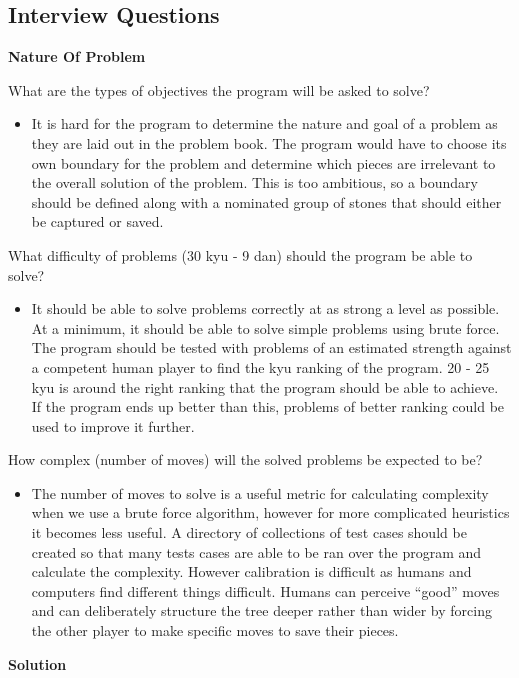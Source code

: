 \documentclass{l3proj}
\begin{document}
\subsection{Interview Questions}

\textbf{Nature Of Problem}

What are the types of objectives the program will be asked to solve?
\begin{itemize}
\item It is hard for the program to determine the nature and goal of a problem as they are laid out in the problem book.  The program would have to choose its own boundary for the problem and determine which pieces are irrelevant to the overall solution of the problem.  This is too ambitious, so a boundary should be defined along with a nominated group of stones that should either be captured or saved.
\end{itemize}
What difficulty of problems (30 kyu - 9 dan) should the program be able to solve?
\begin{itemize}
\item It should be able to solve problems correctly at as strong a level as possible.  At a minimum, it should be able to solve simple problems using brute force.  The program should be tested with problems of an estimated strength against a competent human player to find the kyu ranking of the program.  20 - 25 kyu is around the right ranking that the program should be able to achieve.  If the program ends up better than this, problems of better ranking could be used to improve it further.
\end{itemize}
How complex (number of moves) will the solved problems be expected to be?
\begin{itemize}
\item The number of moves to solve is a useful metric for calculating complexity when we use a brute force algorithm, however for more complicated heuristics it becomes less useful.  A directory of collections of test cases should be created so that many tests cases are able to be ran over the program and calculate the complexity.  However calibration is difficult as humans and computers find different things difficult.  Humans can perceive “good” moves and can deliberately structure the tree deeper rather than wider by forcing the other player to make specific moves to save their pieces.
\end{itemize}

\textbf{Solution}
\end{document}
